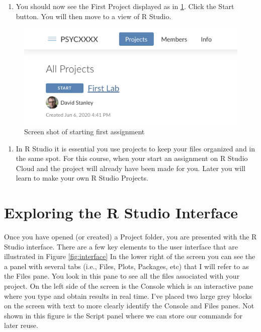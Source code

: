 \documentclass[
]{krantz}
\providecommand{\tightlist}{%
  \setlength{\itemsep}{0pt}\setlength{\parskip}{0pt}}
\begin{document}
\begin{enumerate}
\def\labelenumi{\arabic{enumi}.}
\setcounter{enumi}{4}
\tightlist
\item
  You should now see the First Project displayed as in \ref{fig:assignment}. Click the Start button. You will then move to a view of R Studio.
\end{enumerate}

\begin{figure}
\includegraphics[width=0.7\linewidth]{ch_introduction/images/screenshot_assignment} \caption{Screen shot of starting first assignment}\label{fig:assignment}
\end{figure}

\begin{enumerate}
\def\labelenumi{\arabic{enumi}.}
\setcounter{enumi}{4}
\tightlist
\item
  In R Studio it is essential you use projects to keep your files organized and in the same spot. For this course, when your start an assignment on R Studio Cloud and the project will already have been made for you. Later you will learn to make your own R Studio Projects.
\end{enumerate}

\hypertarget{exploring-the-r-studio-interface}{%
\section{Exploring the R Studio Interface}\label{exploring-the-r-studio-interface}}

Once you have opened (or created) a Project folder, you are presented with the R Studio interface. There are a few key elements to the user interface that are illustrated in Figure \ref{fig:interface} In the lower right of the screen you can see the a panel with several tabs (i.e., Files, Plots, Packages, etc) that I will refer to as the Files pane. You look in this pane to see all the files associated with your project. On the left side of the screen is the Console which is an interactive pane where you type and obtain results in real time. I've placed two large grey blocks on the screen with text to more clearly identify the Console and Files panes. Not shown in this figure is the Script panel where we can store our commands for later reuse.
\end{document}
